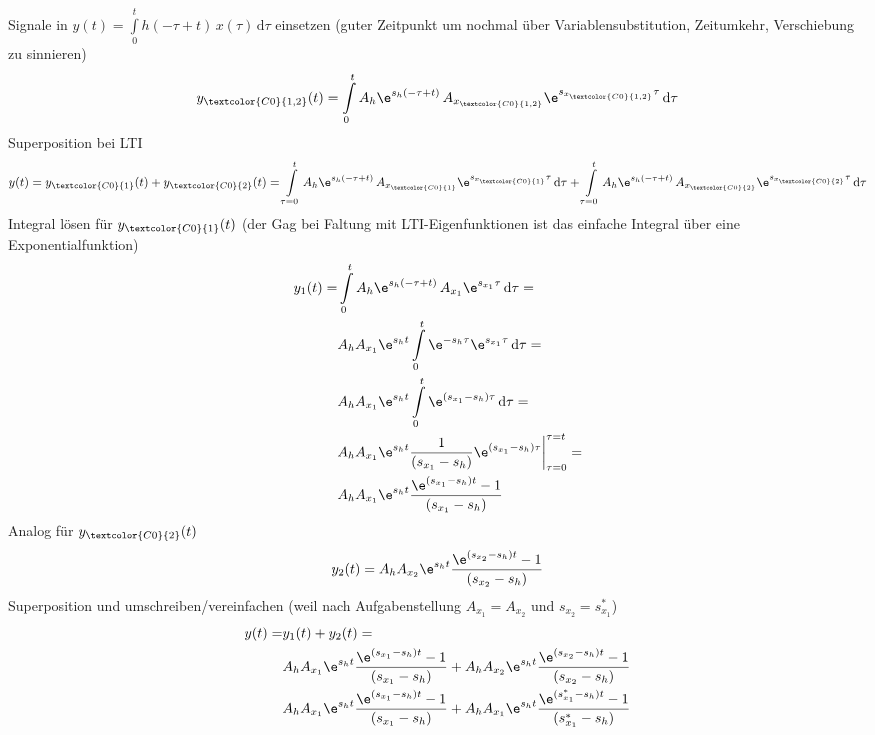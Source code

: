 \begin{ExCalc}
Signale in $y(t) = \int\limits_{0}^{t} h(-\tau+t) \, x(\tau) \, \mathrm{d}\tau$ einsetzen (guter Zeitpunkt um nochmal über Variablensubstitution, Zeitumkehr, Verschiebung zu sinnieren)
%
\begin{align}
y_{\textcolor{C0}{1,2}}(t) = \int\limits_{0}^{t} A_h \e^{s_h (-\tau+t)} \, A_{x_{\textcolor{C0}{1,2}}}\e^{s_{x_{\textcolor{C0}{1,2}}} \tau} \, \mathrm{d}\tau
\end{align}
%
Superposition bei LTI
\begin{align}
y(t) = y_{\textcolor{C0}{1}}(t) + y_{\textcolor{C0}{2}}(t) =
\int\limits_{\tau=0}^{t} A_h \e^{s_h (-\tau+t)} \, A_{x_{\textcolor{C0}{1}}}\e^{s_{x_{\textcolor{C0}{1}}} \tau} \, \mathrm{d}\tau
+\int\limits_{\tau=0}^{t} A_h \e^{s_h (-\tau+t)} \, A_{x_{\textcolor{C0}{2}}}\e^{s_{x_{\textcolor{C0}{2}}} \tau} \, \mathrm{d}\tau
\end{align}
%
Integral lösen für $y_{\textcolor{C0}{1}}(t)$ (der Gag bei Faltung mit LTI-Eigenfunktionen ist das einfache Integral über eine Exponentialfunktion)
\begin{align}
y_1(t) =
&\int\limits_{0}^{t} A_h \e^{s_h (-\tau+t)} \, A_{x_{1}}\e^{s_{x_{1}} \tau} \, \mathrm{d}\tau=\\
&A_h A_{x_{1}} \e^{s_h t} \int\limits_{0}^{t} \e^{- s_h \tau} \e^{s_{x_{1}} \tau} \, \mathrm{d}\tau=\\
&A_h A_{x_{1}} \e^{s_h t} \int\limits_{0}^{t} \e^{(s_{x_{1}}-s_h) \tau} \, \mathrm{d}\tau=\\
&A_h A_{x_{1}} \e^{s_h t}  \frac{1}{(s_{x_{1}}-s_h)} \e^{(s_{x_{1}}-s_h) \tau}\bigg|_{\tau=0}^{\tau = t}=\\
&A_h A_{x_{1}} \e^{s_h t}  \frac{\e^{(s_{x_{1}}-s_h) t}-1}{(s_{x_{1}}-s_h)}
\end{align}
Analog für $y_{\textcolor{C0}{2}}(t)$
\begin{align}
y_2(t) = A_h A_{x_{2}} \e^{s_h t}  \frac{\e^{(s_{x_{2}}-s_h) t}-1}{(s_{x_{2}}-s_h)}
\end{align}
%
Superposition und umschreiben/vereinfachen (weil nach Aufgabenstellung $A_{x_1}=A_{x_2}$ und $s_{x_2} = s^*_{x_1}$)
\begin{align}
y(t) = &y_1(t) + y_2(t) =\\
&A_h A_{x_{1}} \e^{s_h t}  \frac{\e^{(s_{x_{1}}-s_h) t}-1}{(s_{x_{1}}-s_h)}+
A_h A_{x_{2}} \e^{s_h t}  \frac{\e^{(s_{x_{2}}-s_h) t}-1}{(s_{x_{2}}-s_h)}\\
&A_h A_{x_{1}} \e^{s_h t}  \frac{\e^{(s_{x_{1}}-s_h) t}-1}{(s_{x_{1}}-s_h)}+
A_h A_{x_{1}} \e^{s_h t}  \frac{\e^{(s^*_{x_{1}}-s_h) t}-1}{(s^*_{x_{1}}-s_h)}\\

\end{align}
\end{ExCalc}
